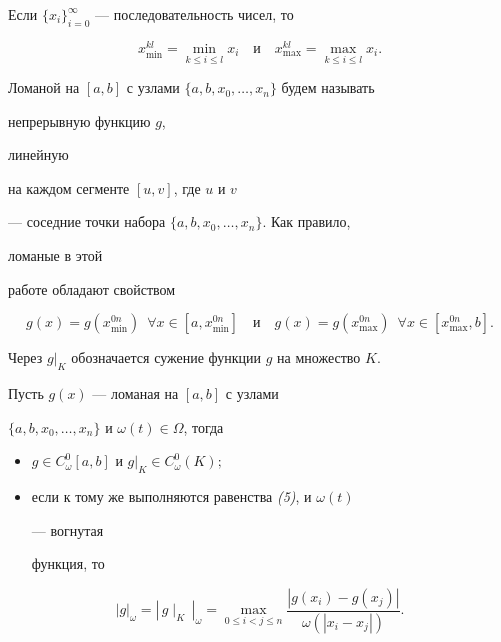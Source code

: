 Если $\{x_i\}^\infty_{i=0}$ --- последовательность чисел, то


$$


x^{kl}_{\min} =\min_{k\le i\le l}x_i \quad


\text{и}\quad


x^{kl}_{\max}=\max_{k\le i\le l}x_i.


$$





Ломаной на $[a,b]$ с узлами $\{a,b,x_0,\dotsc,x_n\}$ будем называть


непрерывную функцию $g$,


линейную


на каждом сегменте $[u,v]$, где $u$ и $v$


--- соседние точки набора $\{a,b,x_0,\dotsc,x_n\}$. Как правило,


ломаные в этой


работе обладают свойством


\begin{equation}


g(x)=g(x^{0n}_{\min}) \ \; \forall x\in[a,x^{0n}_{\min}]\quad


\text{и}\quad


g(x)=g(x^{0n}_{\max}) \ \; \forall x\in[x^{0n}_{\max},b].


\end{equation}


Через $g|_K$ обозначается сужение функции $g$ на множество $K$.





\begin{lem} Пусть $g(x)$ --- ломаная на $[a,b]$ с узлами


$\{a,b,x_0,\dotsc,x_n\}$ и $\omega(t)\in\Omega$, тогда


\begin{itemize}


\item[a)] $g\in C^0_\omega[a,b]$ и $g|_K\in C^0_\omega(K);$


\item[б)] если к тому же выполняются равенства {\em (5)}, и $\omega(t)$


--- вогнутая


функция, то


\end{itemize}


\begin{equation}


|g|_\omega=|\,g\mid_K\,|_\omega=


\max_{0\le i<j\le n}


\frac{|g(x_i)-g(x_j)|}{\omega(|x_i-x_j|)}.


\end{equation}


\end{lem}





